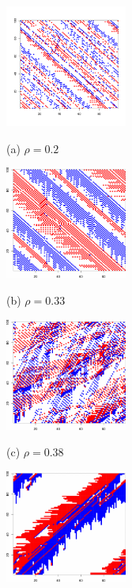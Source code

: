 \documentclass[twocolumn]{article}
\begin{document}
\begin{figure}[!t]
    \begin{minipage}[b]{0.49\linewidth}
      \centering
      \centerline{\includegraphics[width=4.0cm]{./figs/TestBehavior_100_99_10000_02_end.pdf}}
      \centerline{(a) $\rho = 0.2$}\medskip
    \end{minipage}
    \hfill
    \begin{minipage}[b]{0.49\linewidth}
      \centering
      \centerline{\includegraphics[width=4.0cm]{./figs/TestBehavior_100_99_10000_033_end}}
      \centerline{(b) $\rho = 0.33$}\medskip
    \end{minipage}
    \hfill
    \begin{minipage}[b]{0.49\linewidth}
      \centering
      \centerline{\includegraphics[width=4.0cm]{./figs/TestBehavior_100_99_10000_038_end}}
      \centerline{(c) $\rho = 0.38$}\medskip
    \end{minipage}
    \hfill
    \begin{minipage}[b]{0.49\linewidth}
      \centering
      \centerline{\includegraphics[width=4.0cm]{./figs/TestBehavior_100_99_10000_043_end}}

\end{minipage}
\end{figure}
\end{document}
